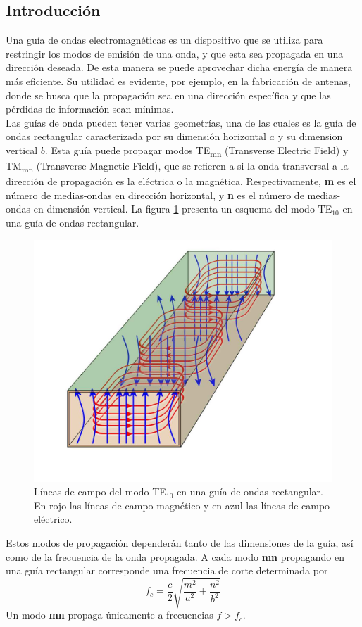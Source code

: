 \documentclass[11pt,a4paper]{article}
\begin{document}
\begin{multicols}{2}
\section{Introducción}
Una guía de ondas electromagnéticas es un dispositivo que se utiliza para restringir los modos de emisión de una onda, y que esta sea propagada en una dirección deseada. De esta manera se puede aprovechar dicha energía de manera más eficiente. Su utilidad es evidente, por ejemplo, en la fabricación de antenas, donde se busca que la propagación sea en una dirección específica y que las pérdidas de información sean mínimas. \\

Las guías de onda pueden tener varias geometrías, una de las cuales es la guía de ondas rectangular caracterizada por su dimensión horizontal $a$ y su dimension vertical $b$. Esta guía puede propagar modos TE\textsubscript{mn} (Transverse Electric Field) y TM\textsubscript{mn} (Transverse Magnetic Field), que se refieren a si la onda transversal a la dirección de propagación es la eléctrica o la magnética. 
Respectivamente, \textbf{m} es el número de medias-ondas en dirección horizontal, y \textbf{n} es el número de medias-ondas en dimensión vertical. 
La figura \ref{fig:te10} presenta un esquema del modo TE$_{10}$ en una guía de ondas rectangular.
\begin{figure}[H]
    \centering
    \includegraphics[width=0.5\linewidth]{Images/TE10.jpg}
    \caption{Líneas de campo del modo TE$_{10}$ en una guía de ondas rectangular. En rojo las líneas de campo magnético y en azul las líneas de campo eléctrico.}
    \label{fig:te10}
\end{figure}
Estos modos de propagación dependerán tanto de las dimensiones de la guía, así como de la frecuencia de la onda propagada. 
A cada modo \textbf{mn} propagando en una guía rectangular corresponde una frecuencia de corte determinada por
\begin{equation}
    f_c = \frac{c}{2}\sqrt{\frac{m^2}{a^2}+\frac{n^2}{b^2}}
\end{equation}
Un modo \textbf{mn} propaga únicamente a frecuencias $f>f_c$.\\


\end{multicols}
\end{document}
